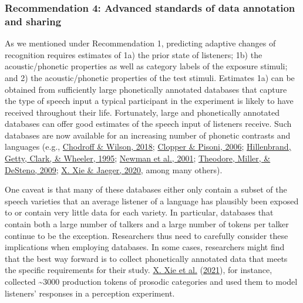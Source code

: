 \documentclass[
  11pt,
  english,
  man,floatsintext]{apa6}
\begin{document}
\hypertarget{recommendation-4-advanced-standards-of-data-annotation-and-sharing}{%
\subsubsection{Recommendation 4: Advanced standards of data annotation and sharing}\label{recommendation-4-advanced-standards-of-data-annotation-and-sharing}}

As we mentioned under Recommendation 1, predicting adaptive changes of recognition requires estimates of 1a) the prior state of listeners; 1b) the acoustic/phonetic properties as well as category labels of the exposure stimuli; and 2) the acoustic/phonetic properties of the test stimuli. Estimates 1a) can be obtained from sufficiently large phonetically annotated databases that capture the type of speech input a typical participant in the experiment is likely to have received throughout their life. Fortunately, large and phonetically annotated databases can offer good estimates of the speech input of listeners receive. Such databases are now available for an increasing number of phonetic contrasts and languages (e.g., \protect\hyperlink{ref-chodroff-wilson2018}{Chodroff \& Wilson, 2018}; \protect\hyperlink{ref-clopper-pisoni2006}{Clopper \& Pisoni, 2006}; \protect\hyperlink{ref-hillenbrand1995}{Hillenbrand, Getty, Clark, \& Wheeler, 1995}; \protect\hyperlink{ref-newman2001}{Newman et al., 2001}; \protect\hyperlink{ref-theodore2009}{Theodore, Miller, \& DeSteno, 2009}; \protect\hyperlink{ref-xie-jaeger2020}{X. Xie \& Jaeger, 2020}, among many others).

One caveat is that many of these databases either only contain a subset of the speech varieties that an average listener of a language has plausibly been exposed to or contain very little data for each variety. In particular, databases that contain both a large number of talkers and a large number of tokens per talker continue to be the exception. Researchers thus need to carefully consider these implications when employing databases. In some cases, researchers might find that the best way forward is to collect phonetically annotated data that meets the specific requirements for their study. \protect\hyperlink{ref-xie2021cognition}{X. Xie et al.} (\protect\hyperlink{ref-xie2021cognition}{2021}), for instance, collected \textasciitilde3000 production tokens of prosodic categories and used them to model listeners' responses in a perception experiment.
\end{document}
